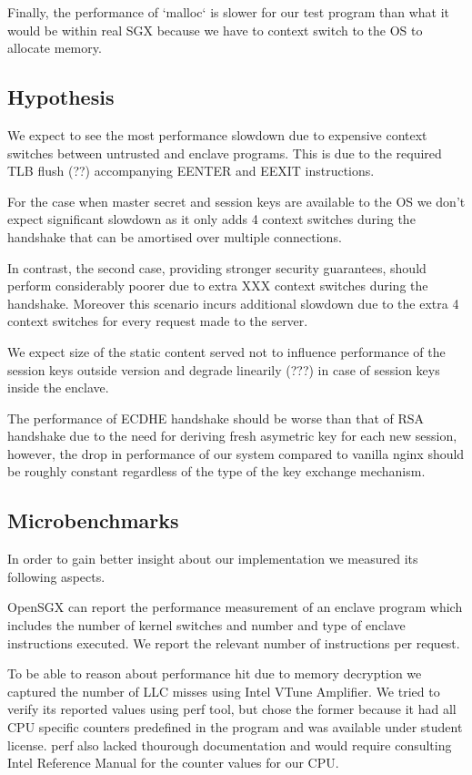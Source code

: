 \documentclass[../main.tex]{subfiles}
\begin{document}
Finally, the performance of `malloc` is slower for our test program
than what it would be within real SGX because we have to context
switch to the OS to allocate memory.

\subsection{Hypothesis}
We expect to see the most performance slowdown due to expensive
context switches between untrusted and enclave programs. This is due
to the required TLB flush (??) accompanying EENTER and EEXIT
instructions.

For the case when master secret and session keys are available to the
OS we don't expect significant slowdown as it only adds 4 context
switches during the handshake that can be amortised over multiple
connections.

In contrast, the second case, providing stronger security guarantees,
should perform considerably poorer due to extra XXX context switches
during the handshake. Moreover this scenario incurs additional
slowdown due to the extra 4 context switches for every request made to
the server.

We expect size of the static content served not to influence
performance of the session keys outside version and degrade linearily
(???) in case of session keys inside the enclave.

The performance of ECDHE handshake should be worse than that of RSA
handshake due to the need for deriving fresh asymetric key for each
new session, however, the drop in performance of our system compared
to vanilla nginx should be roughly constant regardless of the type of
the key exchange mechanism.

\subsection{Microbenchmarks}
In order to gain better insight about our implementation we measured
its following aspects.

OpenSGX can report the performance measurement of an enclave program
which includes the number of kernel switches and number and type of
enclave instructions executed. We report the relevant number of
instructions per request.

To be able to reason about performance hit due to memory decryption we
captured the number of LLC misses using Intel VTune Amplifier. We
tried to verify its reported values using perf tool, but chose the
former because it had all CPU specific counters predefined in the
program and was available under student license. perf also lacked
thourough documentation and would require consulting Intel Reference
Manual for the counter values for our CPU.
 
\end{document}
